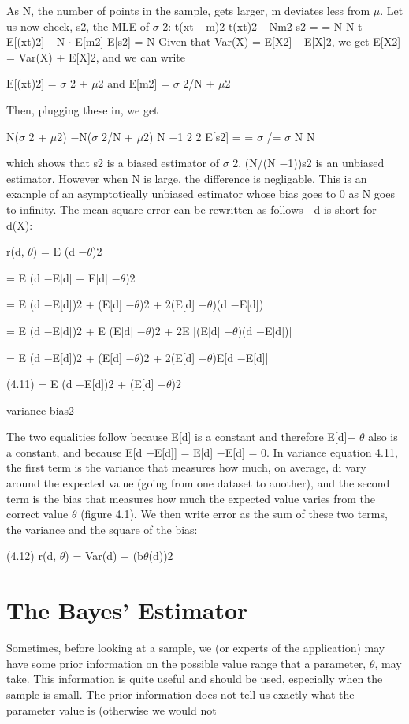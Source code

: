 As N, the number of points in the sample, gets larger, m deviates less from $\mu$. Let us now check, s2, the MLE of $\sigma$ 2: t(xt $-$m)2 t(xt)2 $-$Nm2 s2 = = N N t E[(xt)2] $-$N $\cdot$ E[m2] E[s2] = N Given that Var(X) = E[X2] $-$E[X]2, we get E[X2] = Var(X) + E[X]2, and we can write

E[(xt)2] = $\sigma$ 2 + $\mu$2 and E[m2] = $\sigma$ 2/N + $\mu$2

Then, plugging these in, we get

N($\sigma$ 2 + $\mu$2) $-$N($\sigma$ 2/N + $\mu$2) N $-$1 2 2 E[s2] = = $\sigma$ /= $\sigma$ N N

which shows that s2 is a biased estimator of $\sigma$ 2. (N/(N $-$1))s2 is an unbiased estimator. However when N is large, the difference is negligable. This is an example of an asymptotically unbiased estimator whose bias goes to 0 as N goes to infinity. The mean square error can be rewritten as follows---d is short for d(X):

r(d, $\theta$) = E (d $-$$\theta$)2

= E (d $-$E[d] + E[d] $-$$\theta$)2

= E (d $-$E[d])2 + (E[d] $-$$\theta$)2 + 2(E[d] $-$$\theta$)(d $-$E[d])

= E (d $-$E[d])2 + E (E[d] $-$$\theta$)2 + 2E [(E[d] $-$$\theta$)(d $-$E[d])]

= E (d $-$E[d])2 + (E[d] $-$$\theta$)2 + 2(E[d] $-$$\theta$)E[d $-$E[d]]

(4.11) = E (d $-$E[d])2 + (E[d] $-$$\theta$)2

variance bias2

The two equalities follow because E[d] is a constant and therefore E[d]$-$ $\theta$ also is a constant, and because E[d $-$E[d]] = E[d] $-$E[d] = 0. In variance equation 4.11, the first term is the variance that measures how much, on average, di vary around the expected value (going from one dataset to another), and the second term is the bias that measures how much the expected value varies from the correct value $\theta$ (figure 4.1). We then write error as the sum of these two terms, the variance and the square of the bias:

(4.12) r(d, $\theta$) = Var(d) + (b$\theta$(d))2

\section{The Bayes’ Estimator}

Sometimes, before looking at a sample, we (or experts of the application) may have some prior information on the possible value range that a parameter, $\theta$, may take. This information is quite useful and should be used, especially when the sample is small. The prior information does not tell us exactly what the parameter value is (otherwise we would not

